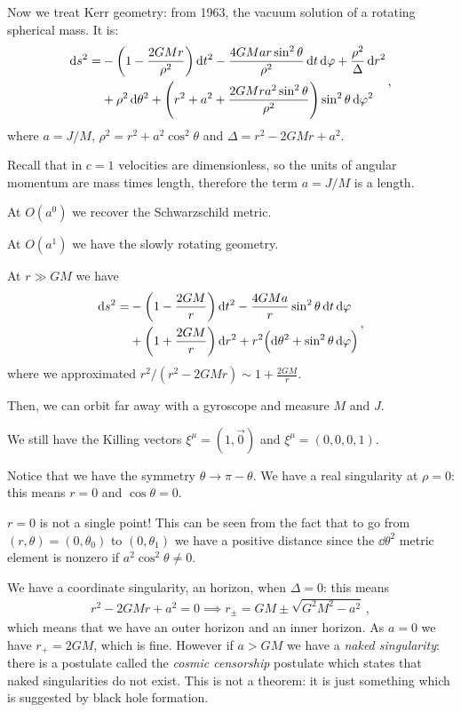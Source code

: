 \documentclass[main.tex]{subfiles}
\begin{document}
Now we treat Kerr geometry: from 1963, the vacuum solution of a rotating spherical mass. It is: 
%
\begin{align}
    \begin{split}    
    \dd{s^2} = 
    &- \qty(1 - \frac{2GMr}{\rho^2}) \dd{t^2} - 
    \frac{4GMar \sin^2\theta }{\rho^2} \dd{t} \dd{\varphi }
    + \frac{\rho^2}{\Delta } \dd{r^2} \\
    &+ \rho^2 \dd{\theta^2} + \qty(r^2+a^2 + \frac{2GMr a^2 \sin^2\theta }{\rho^2}) \sin^2 \theta \dd{\varphi^2}
    \end{split}
\,,
\end{align}
%
where \(a = J/M\), \(\rho^2= r^2+a^2 \cos^2\theta  \) and \(\Delta = r^2 - 2GMr +a^2\). 

Recall that in \(c=1\) velocities are dimensionless, so the units of angular momentum are mass times length, therefore the term \(a = J/M\) is a length. 

At \(O(a^{0})\) we recover the Schwarzschild metric. 

At \(O(a^{1})\) we have the slowly rotating geometry. 

At \(r \gg GM\) we have 
%
\begin{align}
  \begin{split}    
  \dd{s^2} = &- \qty(1 - \frac{2GM}{r}) \dd{t^2}
  - \frac{4GMa}{r} \sin^2 \theta \dd{t} \dd{\varphi } \\
  &+ \qty(1 + \frac{2GM}{r}) \dd{r^2} 
  + r^2 \qty(\dd{\theta^2} + \sin^2 \theta \dd{\varphi })
  \end{split}
\,,
\end{align}
%
where we approximated \(r^2/(r^2-2GMr) \sim 1 + \frac{2GM}{r}\). 

Then, we can orbit far away with a gyroscope and measure \(M\) and \(J\). 

We still have the Killing vectors \(\xi^{\mu } = (1, \vec{0})\) and \(\xi^{\mu }= (0,0,0,1)\). 

Notice that we have the symmetry \(\theta \rightarrow \pi - \theta \). We have a real singularity at \(\rho =0\): this means \(r =0 \) and \(\cos \theta =0\). 

\(r=0\) is not a single point! This can be seen from the fact that to go from \((r, \theta ) = (0, \theta_0 )\) to \((0, \theta_1 )\) we have a positive distance since the \(\dd{\theta^2} \) metric element is nonzero if \(a^2 \cos^2\theta \neq 0\). 

We have a coordinate singularity, an horizon, when \(\Delta = 0\): this means 
%
\begin{align}
  r^2 - 2GMr + a^2 = 0 \implies r_{\pm} =GM \pm \sqrt{G^2M^2-a^2}
\,,
\end{align}
%
which means that we have an outer horizon and an inner horizon. As \(a=0\) we have \(r_+ = 2GM\), which is fine.
However if \(a> GM\) we have a \emph{naked singularity}: there is a postulate called the \emph{cosmic censorship} postulate which states that naked singularities do not exist. 
This is not a theorem: it is just something which is suggested by black hole formation. 
\end{document}
